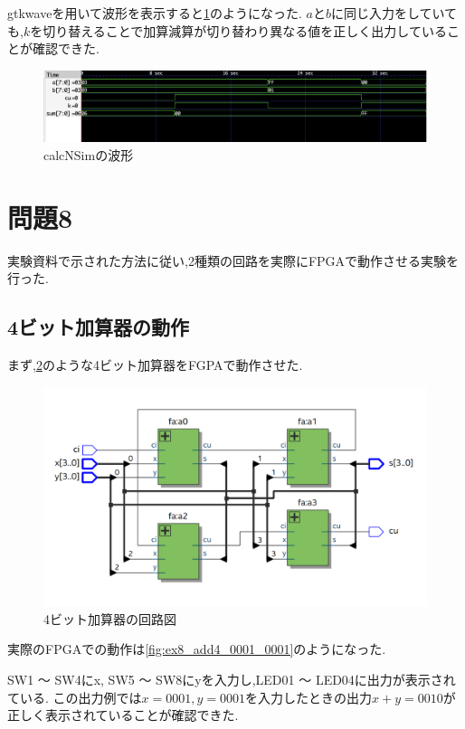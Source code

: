 \documentclass[autodetect-engine, dvi=dvipdfmx, 10pt, a4paper, ja=standard]{bxjsarticle}
\begin{document}
gtkwaveを用いて波形を表示すると\ref{fig:ex7}のようになった.
$a$と$b$に同じ入力をしていても,$k$を切り替えることで加算減算が切り替わり異なる値を正しく出力していることが確認できた.

\begin{figure}[H]
	\centering
	\includegraphics[width=\textwidth]{ex7-wave.png}
	\caption{calcNSimの波形}
	\label{fig:ex7}
\end{figure}

\newpage

\section{問題8}

実験資料で示された方法に従い,2種類の回路を実際にFPGAで動作させる実験を行った.

\subsection{4ビット加算器の動作}

まず,\ref{fig:ex8_add4}のような4ビット加算器をFGPAで動作させた.

\begin{figure}[H]
	\centering
	\includegraphics[width=\textwidth]{ex8_add4.png}
	\caption{4ビット加算器の回路図}
	\label{fig:ex8_add4}
\end{figure}

実際のFPGAでの動作は\ref{fig:ex8_add4_0001_0001}のようになった.

SW1 ～ SW4にx, SW5 ～ SW8にyを入力し,LED01 ～ LED04に出力が表示されている.
この出力例では$x = 0001, y = 0001$を入力したときの出力$x + y = 0010$が正しく表示されていることが確認できた.
\end{document}
